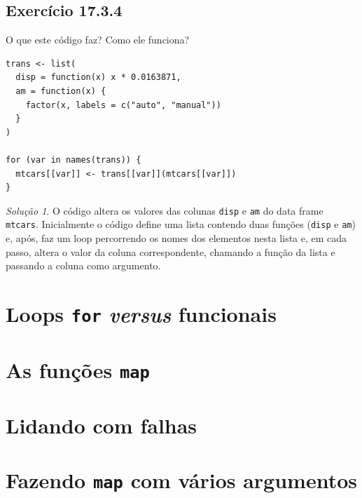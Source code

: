 \documentclass[
]{latex/krantz}
\theoremstyle{definition}
\theoremstyle{definition}
\theoremstyle{definition}
\theoremstyle{definition}
\theoremstyle{remark}
\newtheorem*{solution}{Solução}
\begin{document}
\hypertarget{exr17-3-4}{%
\subsection*{Exercício 17.3.4}\label{exr17-3-4}}

O que este código faz? Como ele funciona?

\begin{verbatim}
trans <- list(
  disp = function(x) x * 0.0163871,
  am = function(x) {
    factor(x, labels = c("auto", "manual"))
  }
)

for (var in names(trans)) {
  mtcars[[var]] <- trans[[var]](mtcars[[var]])
}
\end{verbatim}

\begin{solution}
O código altera os valores das colunas \texttt{disp} e \texttt{am} do data frame \texttt{mtcars}. Inicialmente o código define uma lista contendo duas funções (\texttt{disp} e \texttt{am}) e, após, faz um loop percorrendo os nomes dos elementos nesta lista e, em cada passo, altera o valor da coluna correspondente, chamando a função da lista e passando a coluna como argumento.
\end{solution}

\hypertarget{loops-for-versus-funcionais}{%
\section{\texorpdfstring{Loops \texttt{for} \emph{versus} funcionais}{Loops for versus funcionais}}\label{loops-for-versus-funcionais}}

\hypertarget{as-funuxe7uxf5es-map}{%
\section{\texorpdfstring{As funções \texttt{map}}{As funções map}}\label{as-funuxe7uxf5es-map}}

\hypertarget{lidando-com-falhas}{%
\section{Lidando com falhas}\label{lidando-com-falhas}}

\hypertarget{fazendo-map-com-vuxe1rios-argumentos}{%
\section{\texorpdfstring{Fazendo \texttt{map} com vários argumentos}{Fazendo map com vários argumentos}}\label{fazendo-map-com-vuxe1rios-argumentos}}
\end{document}
